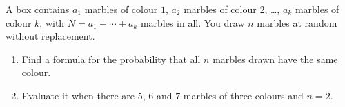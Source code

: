 A box contains $a_1$ marbles of colour $1$, $a_2$ marbles of colour $2$, \dots, $a_k$ marbles of colour $k$, with $N=a_1+\cdots+a_k$ marbles in all. You draw $n$ marbles at random without replacement.
\begin{enumerate}
\item[(a)] Find a formula for the probability that all $n$ marbles drawn have the same colour.
\item[(b)] Evaluate it when there are $5$, $6$ and $7$ marbles of three colours and $n=2$.
\end{enumerate}
